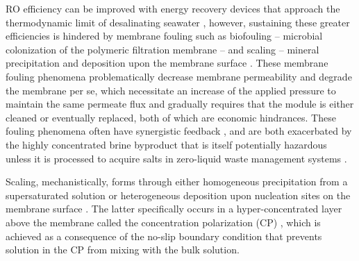 RO efficiency can be improved \cite{Elimelech2011TheEnvironment,Semiat2008EnergyProcesses} with energy recovery devices \cite{Amy2017Membrane-basedProspects} that approach the thermodynamic limit of desalinating seawater \cite{Zarzo2018DesalinationFuture}, however, sustaining these greater efficiencies \cite{Karime2008ROPlant,Hafez2003EconomicsStudy} is hindered by membrane fouling such as biofouling -- microbial colonization of the polymeric filtration membrane \cite{Garcia-Trinanes2021InvestigatingDevice,Radu2010ModelingPassage,Suwarno2014BiofoulingDevelopment} -- and scaling -- mineral precipitation and deposition upon the membrane surface \cite{Warsinger2015ScalingReview,Khan2013SourceSea,Tang2014FoulingPlant,Shmulevsky2017AnalysisMembranes}. These membrane fouling phenomena problematically decrease membrane permeability and degrade the membrane per se, which necessitate an increase of the applied pressure to maintain the same permeate flux and gradually requires that the module is either cleaned or eventually replaced, both of which are economic hindrances. These fouling phenomena often have synergistic feedback \cite{Radu2014ASystems}, and are both exacerbated by the highly concentrated brine byproduct \cite{VanWagner2009EffectPerformance,Belfer1998SurfaceMembranes} that is itself potentially hazardous \cite{Fernandez-torquemada2012DispersionPlants,Clemens1955ToxicityWells,Allen1989ApparatusBrine,Munn1989EffectCrops} unless it is processed to acquire salts \cite{Allen1954ProcessBrine,Fenton1992DesalinationWells} in zero-liquid waste management systems \cite{Jeppesen2009MetalConcentrate,Mavukkandy2019BrineGeneration}. 

Scaling, mechanistically, forms through either homogeneous precipitation from a supersaturated solution or heterogeneous deposition upon nucleation sites on the membrane surface \cite{Karabelas2014IncipientChannels,Warsinger2018InorganicOsmosis}. The latter specifically occurs in a hyper-concentrated layer above the membrane called the concentration polarization (CP)   \cite{McCutcheon2006InfluenceOsmosis,Murthy1997EstimationModel,Gruber2011ComputationalSystems,Sablani2001ConcentrationReview,Zydney1997StagnantSystems}, which is achieved as a consequence of the no-slip boundary condition that prevents solution in the CP from mixing with the bulk solution. 

